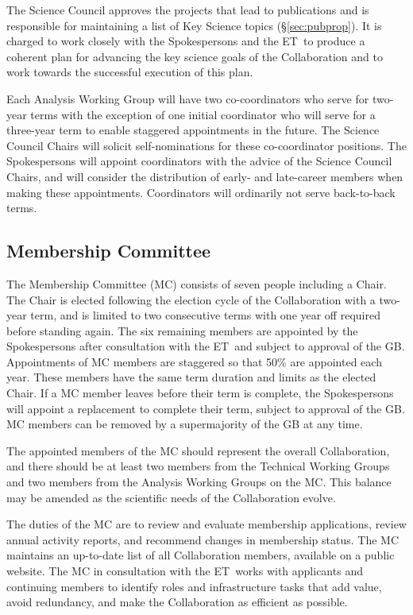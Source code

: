 \documentclass[12pt]{article}
\newcommand{\exec}{{Executive Team}}
\newcommand{\shorte}{{ET}}  %
\begin{document}
The Science Council approves the projects that lead to publications and is responsible for maintaining a list of Key Science topics  (\S\ref{sec:pubprop}). It is charged to work closely with the Spokespersons and the \shorte\ to produce a coherent plan for advancing the key science goals of the Collaboration and to work towards the successful execution of this plan.

Each Analysis Working Group will have two co-coordinators who  serve for two-year terms with the exception of one initial coordinator who will serve for a three-year term to enable staggered appointments in the future.  The Science Council Chairs will solicit self-nominations for these co-coordinator positions. The Spokespersons will appoint coordinators with the advice of the Science Council Chairs, and will consider the distribution of early- and late-career members when making these appointments. Coordinators will ordinarily not serve back-to-back terms.\\


\subsection{Membership Committee}

The Membership Committee (MC) consists of seven people including a Chair. The Chair is elected following the election cycle of the Collaboration with a  two-year term, and is limited to two consecutive terms with one year off required before standing again. The six remaining members are appointed by the Spokespersons after consultation with the \shorte\ and subject to approval of the GB. Appointments of MC members are staggered so that 50\% are appointed each year. These members have the same term duration and limits as the elected Chair. If a MC member leaves before their term is complete, the Spokespersons will appoint a replacement to complete their term, subject to approval of the GB.   MC members can be removed by a supermajority of the GB at any time.  

The appointed members of the MC should represent the overall Collaboration, and there should be at least two members from the Technical Working Groups and two members from the Analysis Working Groups on the MC.  This balance may be amended as the scientific needs of the Collaboration evolve. 

The duties of the MC  are to review and evaluate membership applications, review annual activity reports, and recommend changes in membership status. The MC maintains an up-to-date list of all Collaboration members, available on a public website.  The MC in consultation with the \shorte\ works with applicants and continuing members to identify roles and infrastructure tasks that add value, avoid redundancy, and make the Collaboration as efficient as possible.
\end{document}
